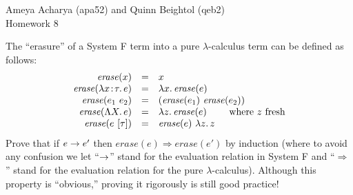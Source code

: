 \documentclass[10pt]{article}
\begin{document}
Ameya Acharya (apa52) and Quinn Beightol (qeb2)\\

Homework 8\\


\begin{exercise}
\end{exercise}

\begin{exercise}
  The ``erasure'' of a System F term into a pure $\lambda$-calculus
  term can be defined as follows:
%
\[
\begin{array}{rcl}
\mathit{erase}(x) & = & x\\
\mathit{erase}(\lambda x \!:\! \tau.\,e) & = & \lambda x.\,\mathit{erase}(e)\\
\mathit{erase}(e_1~e_2) & = & (\mathit{erase}(e_1)~ \mathit{erase}(e_2))\\
\mathit{erase}(\Lambda X.\,e) & = & \lambda z.\,\mathit{erase}(e)~\qquad \text{where}~z~\text{fresh}\\
\mathit{erase}(e~[\tau]) & =& \mathit{erase}(e)~\lambda z.\,z
\end{array}
\]
%
Prove that if $e \rightarrow e'$ then
$(e) \Rightarrow {}(e')$ by induction (where
to avoid any confusion we let ``$\rightarrow$'' stand for the evaluation
relation in System F and ``$\Rightarrow$'' stand for the evaluation
relation for the pure $\lambda$-calculus). Although this property is
``obvious,'' proving it rigorously is still good practice!
\end{exercise}
\end{document}
